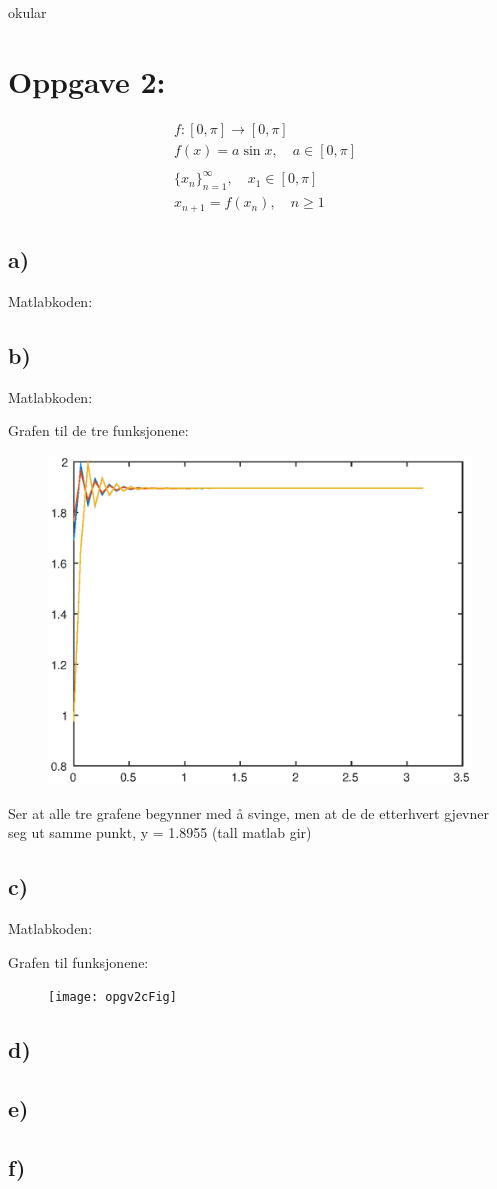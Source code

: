 okular\documentclass[a4paper, norsk, twoside, 10pt]{article}
\begin{document}
\newpage

\section*{Oppgave 2:}
\[\begin{split}
&f  :  [0, \pi] \rightarrow [0, \pi]\\
&f(x) = a\sin{x}, \quad  a \in [0, \pi]\\
&\\
&\{x_{n}\}_{n=1}^{\infty}, \quad x_{1} \in [0, \pi]\\
&x_{n+1} = f(x_{n}), \quad n \geq 1
\end{split}\]


\subsection*{a)}
Matlabkoden:


\subsection*{b)}

Matlabkoden:

Grafen til de tre funksjonene:
\begin{figure}[H]
    \centering
    \includegraphics{opgv2bFig}
\end{figure} 

Ser at alle tre grafene begynner med å svinge, men at de de etterhvert gjevner seg ut samme punkt, y = 1.8955 (tall matlab gir)

\subsection*{c)}
Matlabkoden:

Grafen til funksjonene:
\begin{figure}[H]
    \centering
    \texttt{[image: opgv2cFig]}
\end{figure} 

\subsection*{d)}
\subsection*{e)}
\subsection*{f)}
\end{document}
